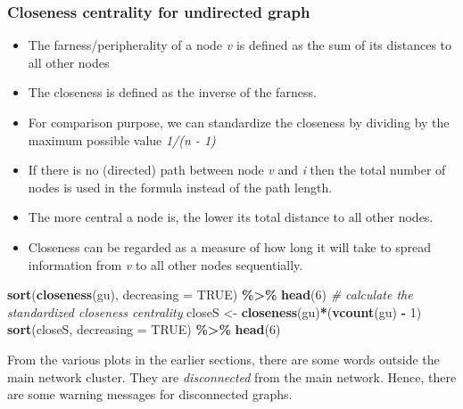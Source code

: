 \documentclass[
]{article}
\newenvironment{Shaded}{\begin{snugshade}}{\end{snugshade}}
\newcommand{\AttributeTok}[1]{\textcolor[rgb]{0.13,0.29,0.53}{#1}}
\newcommand{\CommentTok}[1]{\textcolor[rgb]{0.56,0.35,0.01}{\textit{#1}}}
\newcommand{\ConstantTok}[1]{\textcolor[rgb]{0.56,0.35,0.01}{#1}}
\newcommand{\DecValTok}[1]{\textcolor[rgb]{0.00,0.00,0.81}{#1}}
\newcommand{\FunctionTok}[1]{\textcolor[rgb]{0.13,0.29,0.53}{\textbf{#1}}}
\newcommand{\NormalTok}[1]{#1}
\newcommand{\OtherTok}[1]{\textcolor[rgb]{0.56,0.35,0.01}{#1}}
\newcommand{\SpecialCharTok}[1]{\textcolor[rgb]{0.81,0.36,0.00}{\textbf{#1}}}
\providecommand{\tightlist}{%
  \setlength{\itemsep}{0pt}\setlength{\parskip}{0pt}}
\begin{document}
\hypertarget{closeness-centrality-for-undirected-graph}{%
\subsubsection{Closeness centrality for undirected graph}\label{closeness-centrality-for-undirected-graph}}

\begin{itemize}
\tightlist
\item
  The farness/peripherality of a node \emph{v} is defined as the sum of its distances to all other nodes
\item
  The closeness is defined as the inverse of the farness.
\item
  For comparison purpose, we can standardize the closeness by dividing by the maximum possible value \emph{1/(n - 1)}
\item
  If there is no (directed) path between node \emph{v} and \emph{i} then the total number of nodes is used in the formula instead of the path length.
\item
  The more central a node is, the lower its total distance to all other nodes.
\item
  Closeness can be regarded as a measure of how long it will take to spread information from \emph{v} to all other nodes sequentially.
\end{itemize}

\footnotesize

\begin{Shaded}
\begin{Highlighting}[]
\FunctionTok{sort}\NormalTok{(}\FunctionTok{closeness}\NormalTok{(gu), }\AttributeTok{decreasing =} \ConstantTok{TRUE}\NormalTok{) }\SpecialCharTok{\%\textgreater{}\%} \FunctionTok{head}\NormalTok{(}\DecValTok{6}\NormalTok{)}
\CommentTok{\# calculate the standardized closeness centrality}
\NormalTok{closeS }\OtherTok{\textless{}{-}} \FunctionTok{closeness}\NormalTok{(gu)}\SpecialCharTok{*}\NormalTok{(}\FunctionTok{vcount}\NormalTok{(gu) }\SpecialCharTok{{-}} \DecValTok{1}\NormalTok{)}
\FunctionTok{sort}\NormalTok{(closeS, }\AttributeTok{decreasing =} \ConstantTok{TRUE}\NormalTok{) }\SpecialCharTok{\%\textgreater{}\%} \FunctionTok{head}\NormalTok{(}\DecValTok{6}\NormalTok{)}
\end{Highlighting}
\end{Shaded}

\normalsize

From the various plots in the earlier sections, there are some words outside the main network cluster. They are \emph{disconnected} from the main network. Hence, there are some warning messages for disconnected graphs.
\end{document}
